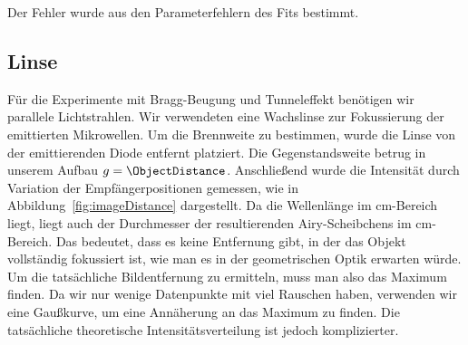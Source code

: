 \documentclass[a4paper,10pt,twocolumn]{article}
\begin{document}
    Der Fehler wurde aus den Parameterfehlern des Fits bestimmt.
    
    \subsection{Linse}

    

    Für die Experimente mit Bragg-Beugung und Tunneleffekt benötigen wir parallele Lichtstrahlen. 
    Wir verwendeten eine Wachslinse zur Fokussierung der emittierten Mikrowellen. 
    Um die Brennweite zu bestimmen, wurde die Linse von der emittierenden Diode entfernt platziert. 
    Die Gegenstandsweite betrug in unserem Aufbau $g = \ObjectDistance$.
    Anschließend wurde die Intensität durch Variation der Empfängerpositionen gemessen, wie in Abbildung~\ref{fig:imageDistance} dargestellt.
    Da die Wellenlänge im cm-Bereich liegt, liegt auch der Durchmesser der resultierenden Airy-Scheibchens im cm-Bereich.
    Das bedeutet, dass es keine Entfernung gibt, in der das Objekt vollständig fokussiert ist, wie man es in der
    geometrischen Optik erwarten würde. 
    Um die tatsächliche Bildentfernung zu ermitteln, muss man also das Maximum finden.
    Da wir nur wenige Datenpunkte mit viel Rauschen haben, verwenden wir eine Gaußkurve,
    um eine Annäherung an das Maximum zu finden.
    Die tatsächliche theoretische Intensitätsverteilung ist jedoch komplizierter.
    
\end{document}
